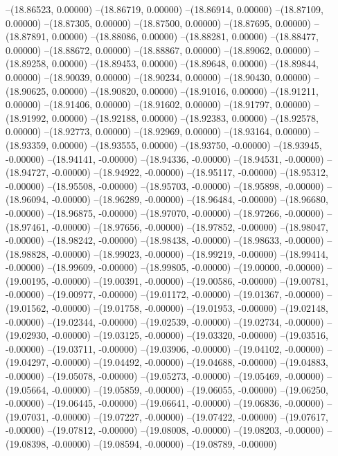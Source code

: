 --(18.86523, 0.00000)
--(18.86719, 0.00000)
--(18.86914, 0.00000)
--(18.87109, 0.00000)
--(18.87305, 0.00000)
--(18.87500, 0.00000)
--(18.87695, 0.00000)
--(18.87891, 0.00000)
--(18.88086, 0.00000)
--(18.88281, 0.00000)
--(18.88477, 0.00000)
--(18.88672, 0.00000)
--(18.88867, 0.00000)
--(18.89062, 0.00000)
--(18.89258, 0.00000)
--(18.89453, 0.00000)
--(18.89648, 0.00000)
--(18.89844, 0.00000)
--(18.90039, 0.00000)
--(18.90234, 0.00000)
--(18.90430, 0.00000)
--(18.90625, 0.00000)
--(18.90820, 0.00000)
--(18.91016, 0.00000)
--(18.91211, 0.00000)
--(18.91406, 0.00000)
--(18.91602, 0.00000)
--(18.91797, 0.00000)
--(18.91992, 0.00000)
--(18.92188, 0.00000)
--(18.92383, 0.00000)
--(18.92578, 0.00000)
--(18.92773, 0.00000)
--(18.92969, 0.00000)
--(18.93164, 0.00000)
--(18.93359, 0.00000)
--(18.93555, 0.00000)
--(18.93750, -0.00000)
--(18.93945, -0.00000)
--(18.94141, -0.00000)
--(18.94336, -0.00000)
--(18.94531, -0.00000)
--(18.94727, -0.00000)
--(18.94922, -0.00000)
--(18.95117, -0.00000)
--(18.95312, -0.00000)
--(18.95508, -0.00000)
--(18.95703, -0.00000)
--(18.95898, -0.00000)
--(18.96094, -0.00000)
--(18.96289, -0.00000)
--(18.96484, -0.00000)
--(18.96680, -0.00000)
--(18.96875, -0.00000)
--(18.97070, -0.00000)
--(18.97266, -0.00000)
--(18.97461, -0.00000)
--(18.97656, -0.00000)
--(18.97852, -0.00000)
--(18.98047, -0.00000)
--(18.98242, -0.00000)
--(18.98438, -0.00000)
--(18.98633, -0.00000)
--(18.98828, -0.00000)
--(18.99023, -0.00000)
--(18.99219, -0.00000)
--(18.99414, -0.00000)
--(18.99609, -0.00000)
--(18.99805, -0.00000)
--(19.00000, -0.00000)
--(19.00195, -0.00000)
--(19.00391, -0.00000)
--(19.00586, -0.00000)
--(19.00781, -0.00000)
--(19.00977, -0.00000)
--(19.01172, -0.00000)
--(19.01367, -0.00000)
--(19.01562, -0.00000)
--(19.01758, -0.00000)
--(19.01953, -0.00000)
--(19.02148, -0.00000)
--(19.02344, -0.00000)
--(19.02539, -0.00000)
--(19.02734, -0.00000)
--(19.02930, -0.00000)
--(19.03125, -0.00000)
--(19.03320, -0.00000)
--(19.03516, -0.00000)
--(19.03711, -0.00000)
--(19.03906, -0.00000)
--(19.04102, -0.00000)
--(19.04297, -0.00000)
--(19.04492, -0.00000)
--(19.04688, -0.00000)
--(19.04883, -0.00000)
--(19.05078, -0.00000)
--(19.05273, -0.00000)
--(19.05469, -0.00000)
--(19.05664, -0.00000)
--(19.05859, -0.00000)
--(19.06055, -0.00000)
--(19.06250, -0.00000)
--(19.06445, -0.00000)
--(19.06641, -0.00000)
--(19.06836, -0.00000)
--(19.07031, -0.00000)
--(19.07227, -0.00000)
--(19.07422, -0.00000)
--(19.07617, -0.00000)
--(19.07812, -0.00000)
--(19.08008, -0.00000)
--(19.08203, -0.00000)
--(19.08398, -0.00000)
--(19.08594, -0.00000)
--(19.08789, -0.00000)
